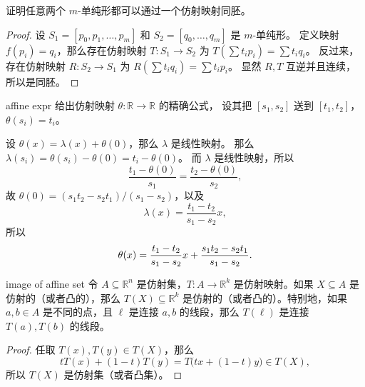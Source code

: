 \documentclass[fontset=none]{Notes}
\begin{document}
\begin{problem}{}{}
  证明任意两个 $m$-单纯形都可以通过一个仿射映射同胚。
\end{problem}
\begin{proof}
  设 $S_1=[p_0,p_1,\dots,p_m]$ 和 $S_2=[q_0,\dots,q_m]$ 是 $m$-单纯形。
  定义映射 $f(p_i)=q_i$，那么存在仿射映射
  $T:S_1\to S_2$ 为 $T(\sum t_ip_i)=\sum t_iq_i$。
  反过来，存在仿射映射 $R:S_2\to S_1$ 为 $R(\sum t_iq_i)=\sum t_ip_i$。
  显然 $R,T$ 互逆并且连续，所以是同胚。
\end{proof}

\begin{problem}{}{affine expr}
  给出仿射映射 $\theta:\mathbb{R}\to \mathbb{R}$ 的精确公式，
  设其把 $[s_1,s_2]$ 送到 $[t_1,t_2]$，$\theta(s_i)=t_i$。
\end{problem}
\begin{solution}
  设 $\theta(x)=\lambda(x)+\theta(0)$，那么 $\lambda$ 是线性映射。
  那么 $\lambda(s_i)=\theta(s_i)-\theta(0)=t_i-\theta(0)$。
  而 $\lambda$ 是线性映射，所以
  \[
    \frac{t_1-\theta(0)}{s_1}=\frac{t_2-\theta(0)}{s_2},
  \]
  故 $\theta(0)=(s_1t_2-s_2t_1)/(s_1-s_2)$，以及
  \[
    \lambda(x)=\frac{t_1-t_2}{s_1-s_2}x,
  \]
  所以
  \[
    \theta(x)=\frac{t_1-t_2}{s_1-s_2}x+\frac{s_1t_2-s_2t_1}{s_1-s_2}.\qedhere
  \]
\end{solution}

\begin{problem}{}{image of affine set}
  令 $A\subseteq \mathbb{R}^n$ 是仿射集，$T:A\to \mathbb{R}^k$
  是仿射映射。如果 $X\subseteq A$ 是仿射的（或者凸的），那么
  $T(X)\subseteq \mathbb{R}^k$ 是仿射的（或者凸的）。特别地，如果 
  $a,b\in A$ 是不同的点，且 $\ell$ 是连接 $a,b$ 的线段，那么
  $T(\ell)$ 是连接 $T(a),T(b)$ 的线段。 
\end{problem}
\begin{proof}
  任取 $T(x),T(y)\in T(X)$，那么
  \[
    tT(x)+(1-t)T(y)=T\bigl(tx+(1-t)y\bigr)\in T(X),
  \]
  所以 $T(X)$ 是仿射集（或者凸集）。
\end{proof}
\end{document}
